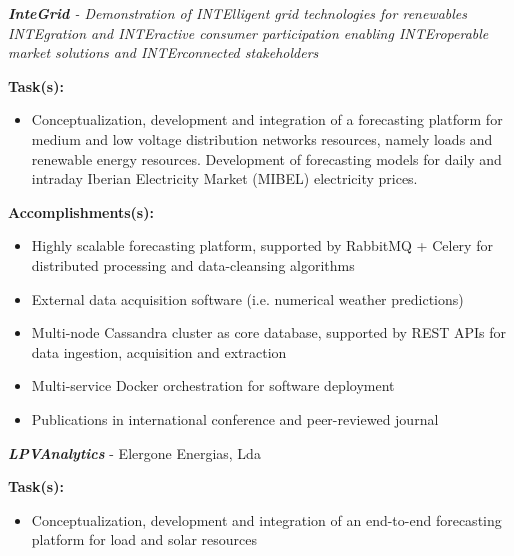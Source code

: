 \documentclass{mycv}
\begin{document}
\begin{myitemize}	
	\item \textit{\textbf{InteGrid} - Demonstration of INTElligent grid technologies for renewables INTEgration and INTEractive consumer participation enabling INTEroperable market solutions and INTErconnected stakeholders}
	
		\vspace{0.15cm}
		\textbf{Task(s):}
		
		\begin{itemize}[itemsep=1px]
		\item Conceptualization, development and integration of a forecasting platform for medium and low voltage distribution networks resources, namely loads and renewable energy resources. Development of forecasting models for daily and intraday Iberian Electricity Market (MIBEL) electricity prices.
		\end{itemize}
		
		\textbf{Accomplishments(s):}
		\begin{itemize}[itemsep=1px]
			\item Highly scalable forecasting platform, supported by RabbitMQ + Celery for distributed processing and data-cleansing algorithms
			\item External data acquisition software (i.e. numerical weather predictions)
			\item Multi-node Cassandra cluster as core database, supported by REST APIs for data ingestion, acquisition and extraction
			\item Multi-service Docker orchestration for software deployment
			\item Publications in international conference and peer-reviewed journal
		\end{itemize}
		\vspace{0.2cm}
		
	
	\vspace{0.15cm}	
	
	\item \textit{\textbf{LPVAnalytics}} - Elergone Energias, Lda
	
		\vspace{0.15cm}
		\textbf{Task(s):}
		
		\begin{itemize}[itemsep=1px]
			\item Conceptualization, development and integration of an end-to-end forecasting platform for load and solar resources
		\end{itemize}
		

\end{myitemize}
\end{document}
